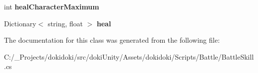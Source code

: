 \begin{DoxyCompactItemize}
\item 
int {\bfseries heal\+Character\+Maximum}\hypertarget{class_battle_skill_ad7fec07d3056bddf27fc5d1d478c518a}{}\label{class_battle_skill_ad7fec07d3056bddf27fc5d1d478c518a}

\item 
Dictionary$<$ string, float $>$ {\bfseries heal}\hypertarget{class_battle_skill_a3b0643cf3c565daad1ba628ff1bf4dd8}{}\label{class_battle_skill_a3b0643cf3c565daad1ba628ff1bf4dd8}

\end{DoxyCompactItemize}


The documentation for this class was generated from the following file\+:\begin{DoxyCompactItemize}
\item 
C\+:/\+\_\+\+Projects/dokidoki/src/doki\+Unity/\+Assets/dokidoki/\+Scripts/\+Battle/Battle\+Skill.\+cs\end{DoxyCompactItemize}
